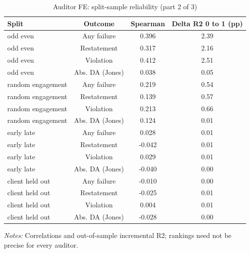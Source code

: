 \begin{table}[htbp]
\footnotesize
\centering
\caption{Auditor FE: split-sample reliability (part 2 of 3)}
\begin{threeparttable}
\begin{tabular}{p{}ccc}
\toprule
Split & Outcome & Spearman & Delta R2 0 to 1 (pp) \\
\midrule
odd even & Any failure & 0.396 & 2.39 \\
odd even & Restatement & 0.317 & 2.16 \\
odd even & Violation & 0.412 & 2.51 \\
odd even & Abs. DA (Jones) & 0.038 & 0.05 \\
random engagement & Any failure & 0.219 & 0.54 \\
random engagement & Restatement & 0.139 & 0.57 \\
random engagement & Violation & 0.213 & 0.66 \\
random engagement & Abs. DA (Jones) & 0.124 & 0.01 \\
early late & Any failure & 0.028 & 0.01 \\
early late & Restatement & -0.042 & 0.01 \\
early late & Violation & 0.029 & 0.01 \\
early late & Abs. DA (Jones) & -0.040 & 0.00 \\
client held out & Any failure & -0.010 & 0.00 \\
client held out & Restatement & -0.025 & 0.01 \\
client held out & Violation & 0.004 & 0.01 \\
client held out & Abs. DA (Jones) & -0.028 & 0.00 \\
\bottomrule
\end{tabular}
\begin{tablenotes}\footnotesize
\item \raggedright \textit{Notes:} Correlations and out-of-sample incremental R2; rankings need not be precise for every auditor.
\end{tablenotes}
\end{threeparttable}
\end{table}

